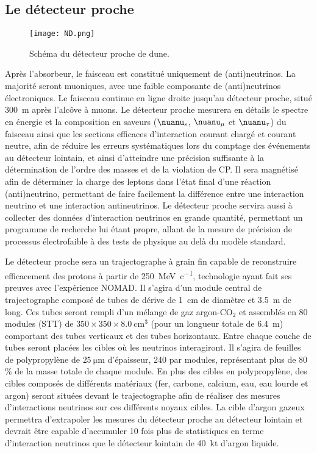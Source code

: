     \subsection{Le détecteur proche}\label{sec::near_detector}

      \begin{figure}[htbp]
        \centering
        \texttt{[image: ND.png]}
        \caption[Schéma du détecteur proche de \gls{dune}]{\label{fig::ND}Schéma du détecteur proche de \gls{dune}.}
      \end{figure}
      Après l'absorbeur, le faisceau est constitué uniquement de (anti)neutrinos. La majorité seront muoniques, avec une faible composante de (anti)neutrinos électroniques. Le faisceau continue en ligne droite jusqu'au détecteur proche, situé \SI{300}{\meter} après l'alcôve à muons. Le détecteur proche mesurera en détails le spectre en énergie et la composition en saveurs ($\nuanu_e$, $\nuanu_{\mu}$ et $\nuanu_{\tau}$) du faisceau ainsi que les sections efficaces d'interaction courant chargé et courant neutre, afin de réduire les erreurs systématiques lors du comptage des événements au détecteur lointain, et ainsi d'atteindre une précision suffisante à la détermination de l'ordre des masses et de la violation de CP. Il sera magnétisé afin de déterminer la charge des leptons dans l'état final d'une réaction (anti)neutrino, permettant de faire facilement la différence entre une interaction neutrino et une interaction antineutrinos. Le détecteur proche servira aussi à collecter des données d'interaction neutrinos en grande quantité, permettant un programme de recherche lui étant propre, allant de la mesure de précision de processus électrofaible à des tests de physique au delà du modèle standard\cite{Collaboration2015}.

      Le détecteur proche sera un trajectographe à grain fin capable de reconstruire efficacement des protons à partir de \SI{250}{\mega\electronvolt\per c}, technologie ayant fait ses preuves avec l'expérience NOMAD\cite{Vannucci2014}. Il s'agira d'un module central de trajectographe composé de  tubes de dérive de \SI{1}{\centi\meter} de diamètre et \SI{3.5}{\meter} de long. Ces tubes seront rempli d'un mélange de gaz argon-CO$_2$ et assemblés en 80 modules (STT) de $350\times350\times\SI{8.0}{\centi\meter\cubed}$ (pour un longueur totale de \SI{6.4}{\meter}) comportant des tubes verticaux et des tubes horizontaux. Entre chaque couche de tubes seront placées les cibles où les neutrinos interagiront. Il s'agira de feuilles de polypropylène de $\SI{25}{\micro\meter}$ d'épaisseur, 240 par modules, représentant plus de 80\,\% de la masse totale de chaque module. En plus des cibles en polypropylène, des cibles composés de différents matériaux (fer, carbone, calcium, eau,  eau lourde et argon) seront situées devant le trajectographe afin de réaliser des mesures d'interactions neutrinos sur ces différents noyaux cibles. La cible d'argon gazeux permettra d'extrapoler les mesures du détecteur proche au détecteur lointain et devrait être capable d'accumuler 10 fois plus de statistiques en terme d'interaction neutrinos que le détecteur lointain de \SI{40}{\kilo\tonne} d'argon liquide.

